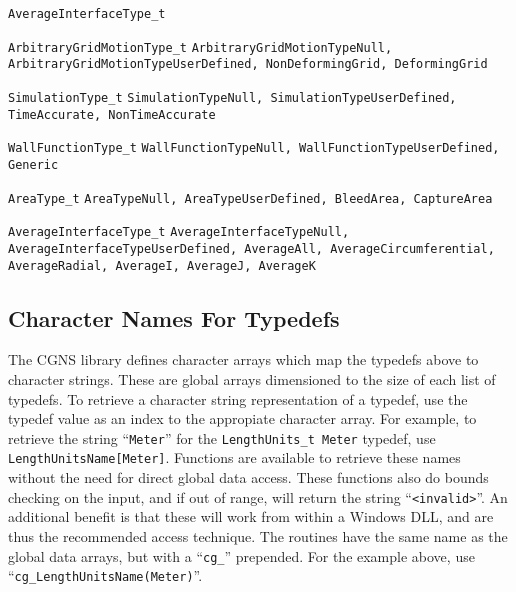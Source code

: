 {\begin{Ventryi}{\texttt{AverageInterfaceType\_t}}
   \item [\texttt{ArbitraryGridMotionType\_t}]
         \texttt{ArbitraryGridMotionTypeNull, ArbitraryGridMotionTypeUserDefined, NonDeformingGrid, DeformingGrid}
   \item [\texttt{SimulationType\_t}]
         \texttt{SimulationTypeNull, SimulationTypeUserDefined, TimeAccurate, NonTimeAccurate}
   \item [\texttt{WallFunctionType\_t}]
         \texttt{WallFunctionTypeNull, WallFunctionTypeUserDefined, Generic}
   \item [\texttt{AreaType\_t}]
         \texttt{AreaTypeNull, AreaTypeUserDefined, BleedArea, CaptureArea}
   \item [\texttt{AverageInterfaceType\_t}]
         \texttt{AverageInterfaceTypeNull, AverageInterfaceTypeUserDefined, AverageAll, AverageCircumferential, AverageRadial, AverageI,
	 AverageJ, AverageK}
\end{Ventryi}
}

\subsection{Character Names For Typedefs}

The CGNS library defines character arrays which map the typedefs above
to character strings.
These are global arrays dimensioned to the size of each list of
typedefs.
To retrieve a character string representation of a typedef, use the
typedef value as an index to the appropiate character array.
For example, to retrieve the string ``\texttt{Meter}''
for the \texttt{LengthUnits\_t Meter} typedef, use
\texttt{LengthUnitsName[Meter]}.
Functions are available to retrieve these names without the need for
direct global data access.
These functions also do bounds checking on the input, and if out of
range, will return the string ``\texttt{<invalid>}''.
An additional benefit is that these will work from within a Windows DLL,
and are thus the recommended access technique.
The routines have the same name as the global data arrays, but with a
``\texttt{cg\_}'' prepended.
For the example above, use ``\texttt{cg\_LengthUnitsName(Meter)}''.

